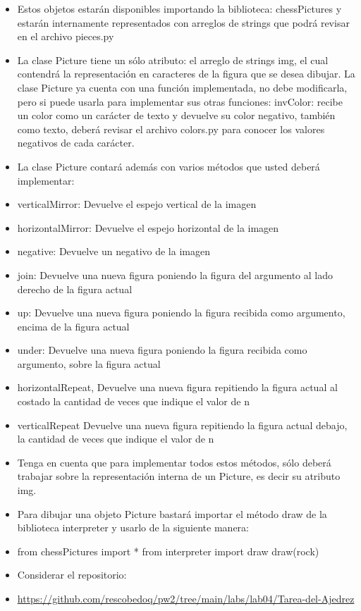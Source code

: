 \documentclass{article}
\begin{document}
\begin{itemize}
\begin{figure}[H]
	\end{figure}
		\item Estos objetos estarán disponibles importando la biblioteca: chessPictures y estarán internamente representados con arreglos de strings que podrá revisar en el archivo pieces.py
		\item La clase Picture tiene un sólo atributo: el arreglo de strings img, el cual contendrá la representación en caracteres de la figura que se desea dibujar. 
La clase Picture ya cuenta con una función implementada, no debe modificarla, pero si puede usarla para implementar sus otras funciones: invColor: recibe un color como un carácter de texto y devuelve su color negativo, también como texto, deberá revisar el archivo colors.py para conocer los valores negativos de cada carácter.
		\item La clase Picture contará además con varios métodos que usted deberá implementar:
		\item verticalMirror: Devuelve el espejo vertical de la imagen
		\item horizontalMirror: Devuelve el espejo horizontal de la imagen
		\item negative: Devuelve un negativo de la imagen
		\item join: Devuelve una nueva figura poniendo la figura del argumento al lado derecho de la figura actual
		\item up: Devuelve una nueva figura poniendo la figura recibida como argumento, encima de la figura actual
		\item under: Devuelve una nueva figura poniendo la figura recibida como argumento, sobre la figura actual
		\item horizontalRepeat, Devuelve una nueva figura repitiendo la figura actual al costado la cantidad de veces que indique el valor de n
		\item verticalRepeat Devuelve una nueva figura repitiendo la figura actual debajo, la cantidad de veces que indique el valor de n
		\item Tenga en cuenta que para implementar todos estos métodos, sólo deberá trabajar sobre la representación interna de un Picture, es decir su atributo img.
		\item Para dibujar una objeto Picture bastará importar el método draw de la biblioteca interpreter y usarlo de la siguiente manera:
		\item from chessPictures import *
 from interpreter import draw
draw(rock)
		\item Considerar el repositorio:
		\item \url{https://github.com/rescobedoq/pw2/tree/main/labs/lab04/Tarea-del-Ajedrez}
	\end{itemize}
\end{document}
